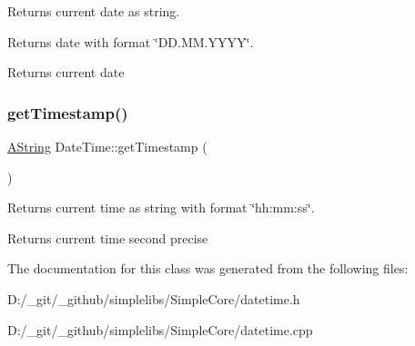 Returns current date as string. 

Returns date with format \char`\"{}\+D\+D.\+M\+M.\+Y\+Y\+Y\+Y\char`\"{}. \begin{DoxyReturn}{Returns}
current date 
\end{DoxyReturn}
\mbox{\label{class_date_time_a272b1eca3f3aafc7d275ec5e8831a6ca}} 
\subsubsection{\texorpdfstring{getTimestamp()}{getTimestamp()}}
{\footnotesize\ttfamily \mbox{\hyperlink{class_a_string}{A\+String}} Date\+Time\+::get\+Timestamp (\begin{DoxyParamCaption}{ }\end{DoxyParamCaption})\hspace{0.3cm}{\ttfamily [static]}}



Returns current time as string with format \char`\"{}hh\+:mm\+:ss\char`\"{}. 

\begin{DoxyReturn}{Returns}
current time second precise 
\end{DoxyReturn}


The documentation for this class was generated from the following files\+:\begin{DoxyCompactItemize}
\item 
D\+:/\+\_\+git/\+\_\+github/simplelibs/\+Simple\+Core/datetime.\+h\item 
D\+:/\+\_\+git/\+\_\+github/simplelibs/\+Simple\+Core/datetime.\+cpp\end{DoxyCompactItemize}
